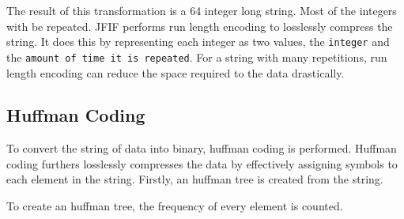 \documentclass{article}
\begin{document}
The result of this transformation is a 64 integer long string.
Most of the integers with be repeated.
JFIF performs run length encoding to losslessly compress the string.
It does this by representing each integer as two values, the \texttt{integer} and the \texttt{amount of time it is repeated}.
For a string with many repetitions, run length encoding can reduce the space required to the data drastically.

\subsection{Huffman Coding}\label{huffman}
To convert the string of data into binary, huffman coding is performed.
Huffman coding furthers losslessly compresses the data by effectively assigning symbols to each element in the string.
Firstly, an huffman tree is created from the string.

To create an huffman tree, the frequency of every element is counted.

\newpage
\printbibliography
\end{document}
